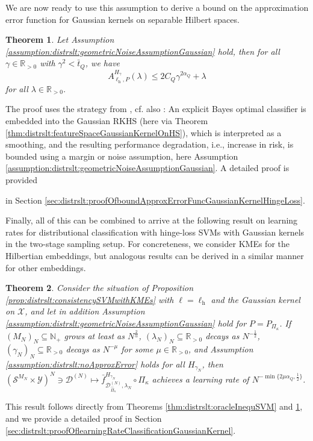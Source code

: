 \documentclass[letterpaper]{article} %
\newcommand{\R}{\mathbb{R}}
\newcommand{\Rp}{\R_{> 0}}
\newcommand{\Np}{\mathbb{N}_+}
\newcommand{\KME}[1]{\Pi_{#1}} %
\newcommand{\samplingSet}{\mathcal{S}} %
\newcommand{\inputSet}{\mathcal{X}} %
\newcommand{\outputSet}{\mathcal{Y}} %
\newcommand{\dataSet}{\mathcal{D}}
\newcommand{\kKME}{\kappa} %
\newcommand{\KMEk}{\KME{\kKME}} %
\newcommand{\KMEhat}{\hat{\Pi}_\kKME} %
\newcommand{\ApproxErrorFunc}[3]{A^{#3}_{#1,#2}}
\newcommand{\clipped}[1]{\bar{#1}}
\newcommand{\ellHinge}{\ell_{\mathrm{h}}} %
\newtheorem{theorem}{Theorem}
\newif\ifCameraReady
\begin{document}
\fi
We are now ready to use this assumption to derive a bound on the approximation error function for Gaussian kernels on separable Hilbert spaces.
\begin{theorem} \label{thm:distrslt:boundApproxErrorFuncGaussianKernelHingeLoss}
Let Assumption \ref{assumption:distrslt:geometricNoiseAssumptionGaussian} hold, then for all $\gamma\in\Rp$ with $\gamma^2<\bar t_Q$, we have
\begin{equation}
    \ApproxErrorFunc{\ellHinge}{P}{H_\gamma}(\lambda) \leq 2C_Q \gamma^{2\alpha_Q} + \lambda
\end{equation}
for all $\lambda\in\Rp$.
\end{theorem}
The proof uses the strategy from \cite[Section~4]{steinwart2007fast}, cf. also \cite[Section~8.2]{SC08}:
An explicit Bayes optimal classifier is embedded into the Gaussian RKHS (here via Theorem \ref{thm:distrslt:featureSpaceGaussianKernelOnHS}), which is interpreted as a smoothing, and the resulting performance degradation, i.e., increase in risk, is bounded using a margin or noise assumption, here Assumption \ref{assumption:distrslt:geometricNoiseAssumptionGaussian}.
A detailed proof is provided 
\ifCameraReady
in the supplementary material.
\else
in Section \ref{sec:distrslt:proofOfboundApproxErrorFuncGaussianKernelHingeLoss}.
\fi

Finally, all of this can be combined to arrive at the following result on learning rates for distributional classification with hinge-loss SVMs with Gaussian kernels in the two-stage sampling setup.
For concreteness, we consider KMEs for the Hilbertian embeddings, but analogous results can be derived in a similar manner for other embeddings.
\begin{theorem} \label{thm:distrslt:learningRateClassificationGaussianKernel}
Consider the situation of Proposition \ref{prop:distrslt:consistencySVMwithKMEs} with $\ell=\ellHinge$ and the Gaussian kernel on $\inputSet$,
and let in addition Assumption \ref{assumption:distrslt:geometricNoiseAssumptionGaussian} hold for $P=P_{\KMEk}$.
If $(M_N)_N\subseteq\Np$ grows at least as $N^{\frac{2}{\alpha}}$, 
$(\lambda_N)_N\subseteq\Rp$ decays as $N^{-\frac12}$, 
$(\gamma_N)_N\subseteq\Rp$ decays as $N^{-\mu}$ for some $\mu\in\Rp$, 
and Assumption \ref{assumption:distrslt:noApproxError} holds for all $H_{\gamma_N}$,
then $(\samplingSet^{M_N}\times \outputSet)^N \ni \dataSet^{(N)}\mapsto \clipped{f}_{\dataSet^{(N)}_{\KMEhat},\lambda_N}^{H_{\gamma_N}} \circ \KMEk$
achieves a learning rate of $N^{-\min\{2\mu\alpha_Q, \frac12\}}$.
\end{theorem}
\ifCameraReady
This result follows directly from Theorems \ref{thm:distrslt:oracleInequSVM} and \ref{thm:distrslt:boundApproxErrorFuncGaussianKernelHingeLoss}.
\else
This result follows directly from Theorems \ref{thm:distrslt:oracleInequSVM} and \ref{thm:distrslt:boundApproxErrorFuncGaussianKernelHingeLoss}, and we provide a detailed proof in Section \ref{sec:distrslt:proofOflearningRateClassificationGaussianKernel}.
\fi
\end{document}
